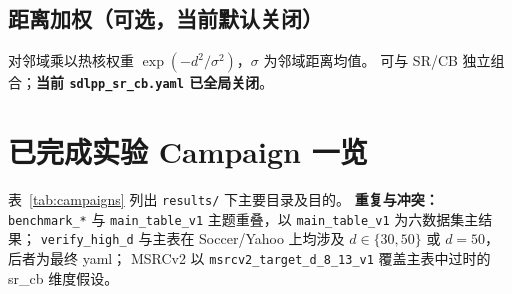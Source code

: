 \documentclass[11pt,a4paper]{article}
\begin{document}
\subsection{距离加权（可选，当前默认关闭）}
对邻域乘以热核权重 $\exp(-d^2/\sigma^2)$，$\sigma$ 为邻域距离均值。
可与 SR/CB 独立组合；\textbf{当前 \texttt{sdlpp\_sr\_cb.yaml} 已全局关闭}。

\section{已完成实验 Campaign 一览}

表~\ref{tab:campaigns} 列出 \texttt{results/} 下主要目录及目的。
\textbf{重复与冲突：} \texttt{benchmark\_*} 与 \texttt{main\_table\_v1} 主题重叠，以 \texttt{main\_table\_v1} 为六数据集主结果；
\texttt{verify\_high\_d} 与主表在 Soccer/Yahoo 上均涉及 $d\in\{30,50\}$ 或 $d=50$，后者为最终 yaml；
MSRCv2 以 \texttt{msrcv2\_target\_d\_8\_13\_v1} 覆盖主表中过时的 sr\_cb 维度假设。
\end{document}

